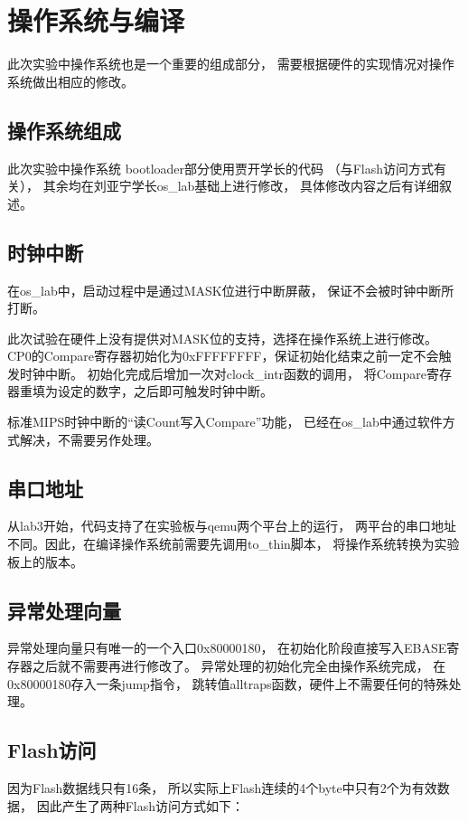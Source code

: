 \section{操作系统与编译}
    此次实验中操作系统也是一个重要的组成部分，%
    需要根据硬件的实现情况对操作系统做出相应的修改。%

        \subsection{操作系统组成}
            此次实验中操作系统%
            bootloader部分使用贾开学长的代码%
            （与Flash访问方式有关），%
            其余均在刘亚宁学长os\_lab基础上进行修改，%
            具体修改内容之后有详细叙述。

        \subsection{时钟中断}
            在os\_lab中，启动过程中是通过MASK位进行中断屏蔽，%
            保证不会被时钟中断所打断。

            此次试验在硬件上没有提供对MASK位的支持，选择在操作系统上进行修改。%
            CP0的Compare寄存器初始化为0xFFFFFFFF，保证初始化结束之前一定不会触发时钟中断。%
            初始化完成后增加一次对clock\_intr函数的调用，%
            将Compare寄存器重填为设定的数字，之后即可触发时钟中断。

            标准MIPS时钟中断的“读Count写入Compare”功能，%
            已经在os\_lab中通过软件方式解决，不需要另作处理。

        \subsection{串口地址}
            从lab3开始，代码支持了在实验板与qemu两个平台上的运行，%
            两平台的串口地址不同。因此，在编译操作系统前需要先调用to\_thin脚本，%
            将操作系统转换为实验板上的版本。

        \subsection{异常处理向量}
            异常处理向量只有唯一的一个入口0x80000180，%
            在初始化阶段直接写入EBASE寄存器之后就不需要再进行修改了。%
            异常处理的初始化完全由操作系统完成，%
            在0x80000180存入一条jump指令，%
            跳转值alltraps函数，硬件上不需要任何的特殊处理。%

        \subsection{Flash访问}
            因为Flash数据线只有16条，%
            所以实际上Flash连续的4个byte中只有2个为有效数据，%
            因此产生了两种Flash访问方式如下：

